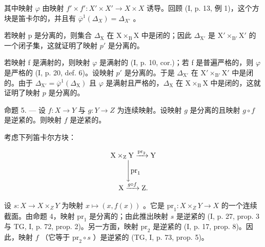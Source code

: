 其中映射 \(\varphi\) 由映射 \(f' \times f': X' \times X' \to X \times X\) 诱导。回顾 (I, p. 13, 例 1)，这个方块是笛卡尔的，并且有 \(\overline{\varphi}^1(\Delta_X) = \Delta_{X'}\) 。

若映射 p 是分离的，则集合 \(\Delta_{\mathrm{X}}\) 在 \(\mathrm{X} \times_{\mathrm{B}} \mathrm{X}\) 中是闭的；因此 \(\Delta_{\mathrm{X}'}\) 是 \(\mathrm{X}' \times_{\mathrm{B}'} \mathrm{X}'\) 的一个闭子集，这就证明了映射 \(p'\) 是分离的。

若映射 f 是满射的，则映射 \(\varphi\) 是满射的 (I, p. 10, cor.)；若 f 是普遍严格的，则 \(\varphi\) 是严格的 (I, p. 20, def. 6)。设映射 \(p'\) 是分离的。于是 \(\Delta_{\mathrm{X}'}\) 在 \(\mathrm{X}' \times_{\mathrm{B}'} \mathrm{X}'\) 中是闭的。由于 \(\Delta_{\mathrm{X}'} = \overline{\varphi}^{1}(\Delta_{\mathrm{X}})\) 且 \(\varphi\) 是满射且严格的，\(\Delta_{\mathrm{X}}\) 在 \(\mathrm{X} \times_{\mathrm{B}} \mathrm{X}\) 中是闭的，这就证明了映射 \(p\) 是分离的。

命题 5. --- 设 \(f: X \to Y\) 与 \(g: Y \to Z\) 为连续映射。设映射 \(g\) 是分离的且映射 \(g \circ f\) 是逆紧的。则映射 \(f\) 是逆紧的。

考虑下列笛卡尔方块：

\[
\begin{array}{c} \mathrm{X} \times_ {\mathrm{Z}} \mathrm{Y} \xrightarrow {\operatorname{pr} _ {2}} \mathrm{Y} \\ \Biggl \downarrow \operatorname{pr} _ {1} \\ \mathrm{X} \xrightarrow {g \circ f} \mathrm{Z}. \end{array}
\]

设 \(s \colon X \to X \times_{Z} Y\) 为映射 \(x \mapsto (x, f(x))\) 。它是 \(\mathrm{pr}_1 \colon X \times_{Z} Y \to X\) 的一个连续截面。由命题 4，映射 \(\mathrm{pr}_1\) 是分离的；由此推出映射 \(s\) 是逆紧的 (I, p. 27, prop. 3 与 TG, I, p. 72, prop. 2)。另一方面，映射 \(\mathrm{pr}_2\) 是逆紧的 (I, p. 17, prop. 8)。因此，映射 \(f\) （它等于 \(\mathrm{pr}_2 \circ s\) ）是逆紧的 (TG, I, p. 73, prop. 5)。


